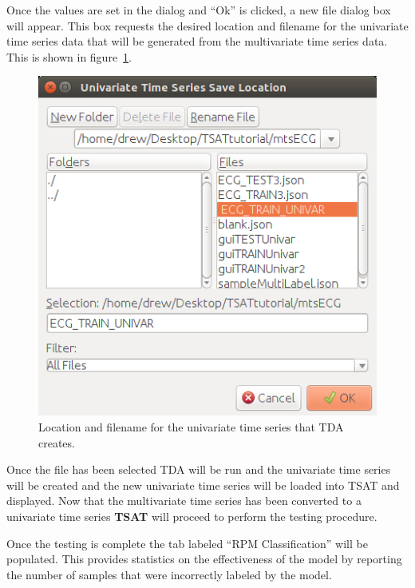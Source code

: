 \documentclass[titlepage, letterpaper, 12pt]{article}
\newcommand\TSAT{\textbf{TSAT}}
\begin{document}
Once the values are set in the dialog and ``Ok'' is clicked, a new file dialog box will appear.  This box requests the desired location and filename for the univariate time series data that will be generated from the multivariate time series data.  This is shown in figure~\ref{fig:univartssavelocTest}.

\begin{figure}
	\centering
	\includegraphics[width=\textwidth]{pictures/univarTSSaveLoc}
	\caption{Location and filename for the univariate time series that TDA creates.}
	\label{fig:univartssavelocTest}
\end{figure}


Once the file has been selected TDA will be run and the univariate time series will be created and the new univariate time series will be loaded into TSAT and displayed.  Now that the multivariate time series has been converted to a univariate time series {\TSAT} will proceed to perform the testing procedure.

\newpage
Once the testing is complete the tab labeled ``RPM Classification'' will be populated. This provides statistics on the effectiveness of the model by reporting the number of samples that were incorrectly labeled by the model.
\end{document}
